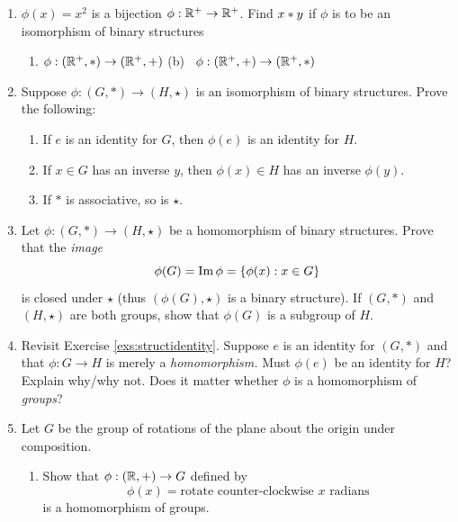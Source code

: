 \begin{exercises}{}
\begin{enumerate}
	  
		\item $\phi(x)=x^2$ is a bijection $\phi:\mathbb{R}^+\to\mathbb{R}^+$. Find $x\mathbin{\ast} y$ if $\phi$ is to be an isomorphism of binary structures
		\begin{enumerate}
		  \item $\phi:(\mathbb{R}^+,\ast)\to(\mathbb{R}^+,+)$ \qquad\qquad (b) \ $\phi:(\mathbb{R}^+,+)\to(\mathbb{R}^+,\ast)$
		\end{enumerate}
	  
	  
	
	  
	  \item\label{exs:structural1} Suppose $\phi:(G,*)\to (H,\star)$ is an isomorphism of binary structures. Prove the following:
	  \begin{enumerate}
	    \item\label{exs:structidentity} If $e$ is an identity for $G$, then $\phi(e)$ is an identity for $H$.
	    
	    \item If $x\in G$ has an inverse $y$, then $\phi(x)\in H$ has an inverse $\phi(y)$.
	    
	    \item If $*$ is associative, so is $\star$.
	  \end{enumerate}
	  
	  
	  \item Let $\phi:(G,*)\to (H,\star)$ be a homomorphism of binary structures. Prove that the \emph{image}
	  \[
	  	\phi(G)=\operatorname{Im} \phi=\{\phi(x):x\in G\}
	  \]
	  is closed under $\star$ (thus $(\phi(G),\star)$ is a binary structure). If $(G,*)$ and $(H,\star)$ are both groups, show that $\phi(G)$ is a subgroup of $H$.
	  
	  
	  \item Revisit Exercise \ref{exs:structidentity}. Suppose $e$ is an identity for $(G,*)$ and that $\phi:G\to H$ is merely a \emph{homomorphism.} Must $\phi(e)$ be an identity for $H$? Explain why/why not. Does it matter whether $\phi$ is a homomorphism of \emph{groups}?
	  
	  
	  \item Let $G$ be the group of rotations of the plane about the origin under composition.
	  \begin{enumerate}
			\item Show that $\phi:(\mathbb{R},+)\to G$ defined by
			\[
				\phi(x)=\text{rotate counter-clockwise $x$ radians}
			\]
	  	is a homomorphism of groups.
	  	

\end{enumerate}
\end{enumerate}
\end{exercises}
